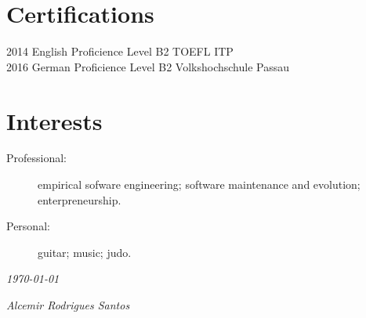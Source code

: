 \documentclass[nocolors]{friggeri-cv-a4}
\begin{document}
\section{Certifications}
\begin{entrylist}
	\entry
	{2014}
	{English Proficience Level B2}
	{TOEFL ITP}\\
	
	\entry
	{2016}
	{German Proficience Level B2}
	{Volkshochschule Passau}\\
\end{entrylist}




\section{Interests}
\begin{description}
	\item[Professional:] empirical sofware engineering; software maintenance and evolution; enterpreneurship.
	
	\item[Personal:] guitar; music; judo.
\end{description}



\hspace{4cm}
\begin{flushleft}
	\emph{\today}
\end{flushleft}
\begin{flushright}
	\emph{Alcemir Rodrigues Santos}
\end{flushright}


\newpage
\end{document}
